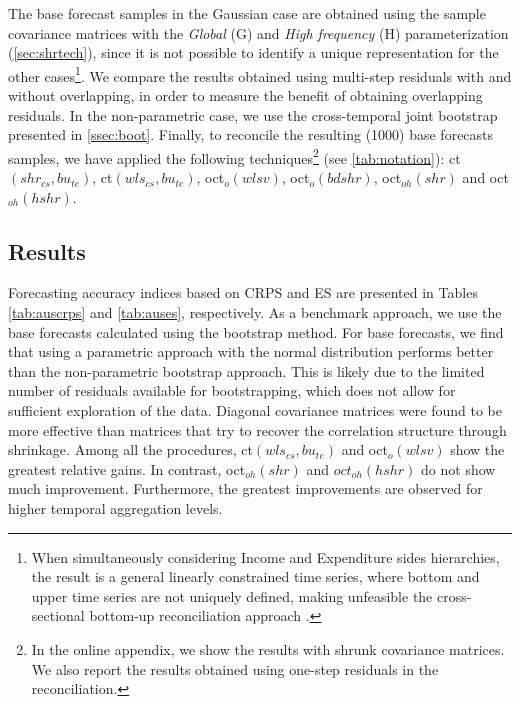 \documentclass[12pt]{article}
\theoremstyle{definition}
\begin{document}
The base forecast samples in the Gaussian case are obtained using the sample covariance matrices with the \textit{Global} (G) and \textit{High frequency} (H) parameterization (\autoref{sec:shrtech}), since it is not possible to identify a unique representation for the other cases\footnote{When simultaneously considering Income and Expenditure sides hierarchies, the result is a general linearly constrained time series, where bottom and upper time series are not uniquely defined, making unfeasible the cross-sectional bottom-up reconciliation approach \citep{giro2022}.}. We compare the results obtained using multi-step residuals with and without overlapping, in order to measure the benefit of obtaining overlapping residuals. In the non-parametric case, we use the cross-temporal joint bootstrap presented in \autoref{ssec:boot}. Finally, to reconcile the resulting (1000) base forecasts samples, we have applied the following techniques\footnote{In the online appendix, we show the results with shrunk covariance matrices. We also report the results obtained using one-step residuals in the reconciliation.} (see \autoref{tab:notation}): ct$(shr_{cs}, bu_{te})$, ct$(wls_{cs}, bu_{te})$, oct$_o(wlsv)$, oct$_o(bdshr)$, oct$_{oh}(shr)$ and oct$_{oh}(hshr)$.

\subsection{Results}\label{ssec:ausresults}

Forecasting accuracy indices based on CRPS and ES are presented in Tables \ref{tab:auscrps} and \ref{tab:auses}, respectively. As a benchmark approach, we use the base forecasts calculated using the bootstrap method. For base forecasts, we find that using a parametric approach with the normal distribution performs better than the non-parametric bootstrap approach. This is likely due to the limited number of residuals available for bootstrapping, which does not allow for sufficient exploration of the data. Diagonal covariance matrices were found to be more effective than matrices that try to recover the correlation structure through shrinkage. Among all the procedures, ct$(wls_{cs},bu_{te})$ and oct$_o(wlsv)$ show the greatest relative gains. In contrast, oct$_{oh}(shr)$ and $oct_{oh}(hshr)$ do not show much improvement. Furthermore, the greatest improvements are observed for higher temporal aggregation levels.
\end{document}
